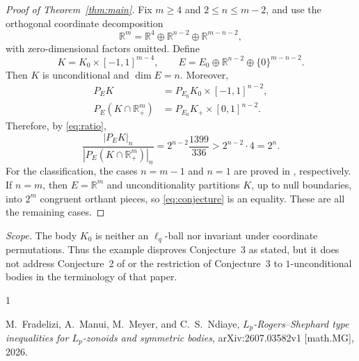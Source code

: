 \documentclass[11pt]{amsart}
\theoremstyle{remark}
\newcommand{\R}{\mathbb{R}}
\begin{document}
\begin{proof}[Proof of Theorem~\ref{thm:main}]
Fix $m\ge4$ and $2\le n\le m-2$, and use the orthogonal coordinate
decomposition
\[
  \R^m=\R^4\oplus\R^{n-2}\oplus\R^{m-n-2},
\]
with zero-dimensional factors omitted. Define
\[
  K=K_0\times[-1,1]^{m-4},
  \qquad
  E=E_0\oplus\R^{n-2}\oplus\{0\}^{m-n-2}.
\]
Then $K$ is unconditional and $\dim E=n$. Moreover,
\begin{align*}
  P_EK&=P_{E_0}K_0\times[-1,1]^{n-2},\\
  P_E(K\cap\R_+^m)&=P_{E_0}K_+\times[0,1]^{n-2}.
\end{align*}
Therefore, by \eqref{eq:ratio},
\[
  \frac{|P_EK|_n}{|P_E(K\cap\R_+^m)|_n}
  =2^{n-2}\frac{1399}{336}
  >2^{n-2}\cdot4
  =2^n.
\]
For the classification, the cases $n=m-1$ and $n=1$ are proved in
\cite[Propositions~3 and~4]{FMMN}, respectively. If $n=m$, then $E=\R^m$ and
unconditionality partitions $K$, up to null boundaries, into $2^m$ congruent
orthant pieces, so \eqref{eq:conjecture} is an equality. These are all the
remaining cases.
\end{proof}

\medskip
\noindent\textit{Scope.}
The body $K_0$ is neither an $\ell_q$-ball nor invariant under coordinate
permutations. Thus the example disproves Conjecture~3 as stated, but it does
not address Conjecture~2 of \cite{FMMN} or the restriction of Conjecture~3 to
$1$-unconditional bodies in the terminology of that paper.

\begin{thebibliography}{1}

M.~Fradelizi, A.~Manui, M.~Meyer, and C.~S.~Ndiaye,
\emph{$L_p$-Rogers--Shephard type inequalities for $L_p$-zonoids and symmetric
bodies}, arXiv:2607.03582v1 [math.MG], 2026.

\end{thebibliography}
\end{document}
